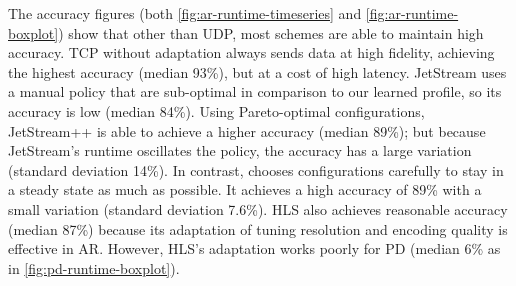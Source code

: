 
The accuracy figures (both \autoref{fig:ar-runtime-timeseries} and
\autoref{fig:ar-runtime-boxplot}) show that other than UDP, most schemes are
able to maintain high accuracy. TCP without adaptation always sends data at high
fidelity, achieving the highest accuracy (median 93\%), but at a cost of high
latency. JetStream uses a manual policy that are sub-optimal in comparison to
our learned profile, so its accuracy is low (median 84\%). Using Pareto-optimal
configurations, JetStream++ is able to achieve a higher accuracy (median 89\%);
but because JetStream's runtime oscillates the policy, the accuracy has a large
variation (standard deviation 14\%). In contrast, \sysname{} chooses
configurations carefully to stay in a steady state as much as possible.  It
achieves a high accuracy of 89\% with a small variation (standard deviation
7.6\%). HLS also achieves reasonable accuracy (median 87\%) because its
adaptation of tuning resolution and encoding quality is effective in
AR. However, HLS's adaptation works poorly for PD (median 6\% as in
\autoref{fig:pd-runtime-boxplot}).


